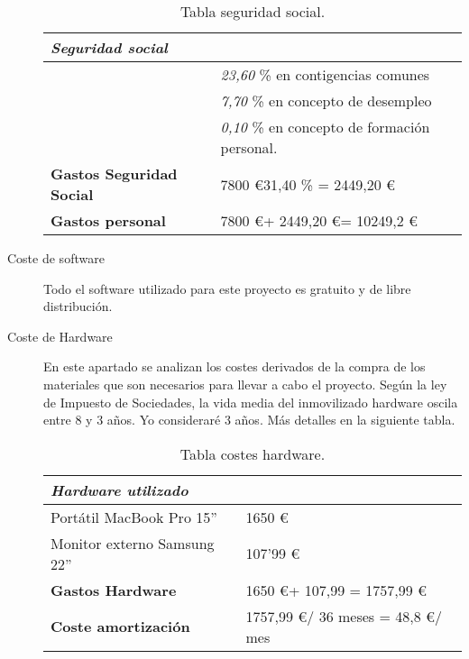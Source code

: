 \begin{description}
	
	\begin{table}[htbp]
\begin{center}
\begin{tabular}{|l|l|}
\hline
 \emph{Seguridad social} &  \\
\hline \hline
 & \emph{23,60} \% en contigencias comunes \\ \hline
&   \emph{7,70} \% en concepto de desempleo \\ \hline
 &   \emph{0,10} \% en concepto de formación personal. \\ \hline
\textbf{Gastos Seguridad Social}  &   7800 \euro  * 31,40 \% =  2449,20 \euro \\ \hline
\textbf{Gastos personal}  &  7800 \euro  + 2449,20 \euro  = 10249,2 \euro  \\ \hline
\end{tabular}
\caption{Tabla seguridad social.}
\label{tabla:ssocial}
\end{center}
\end{table}
	
	\item[Coste de software] Todo el software utilizado para este proyecto es gratuito y de libre distribución. 
	
	\item[Coste de Hardware] En este apartado se analizan los costes derivados de la compra de los materiales que son necesarios para llevar a cabo el proyecto. Según la ley de Impuesto de Sociedades, la vida media del inmovilizado  hardware oscila entre 8 y 3 a\~nos. Yo consideraré 3 años. Más detalles en la siguiente tabla.  
	
\begin{table}[htbp]
\begin{center}
\begin{tabular}{|l|l|}
\hline
 \emph{Hardware utilizado}&  \\
\hline \hline
 Portátil MacBook Pro 15'' & 1650 \euro  \\ \hline
Monitor externo Samsung 22'' &    107'99 \euro\\ \hline
\textbf{Gastos Hardware}  &   1650 \euro + 107,99  =  1757,99 \euro \\ \hline
\textbf{Coste amortización}  &  1757,99 \euro  / 36 meses = 48,8 \euro / mes  \\ \hline
\end{tabular}
\caption{Tabla costes hardware.}
\label{tabla:hardware}
\end{center}
\end{table}


\end{description}
